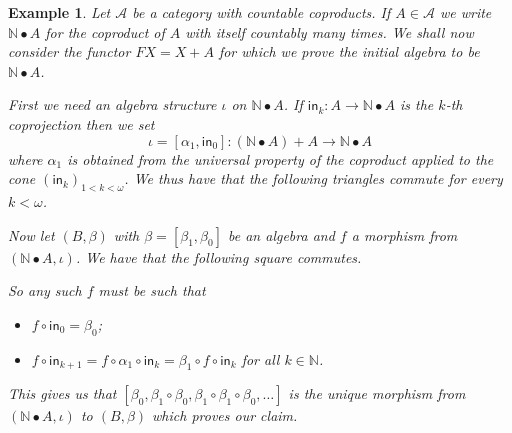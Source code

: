 \documentclass[letterpaper, 11pt, oneside]{memoir}
\theoremstyle{myteo}
\newtheorem{example}[theorem]{Example}
\numberwithin{equation}{section}
\newcommand{\id}{\textsf{id}}
\begin{document}
\begin{example}
  Let \(\mathscr{A}\) be a category with countable coproducts.
  If \(A \in \mathscr{A}\) we write \(\mathbb{N} \bullet A\) for the coproduct of \(A\) with itself countably many times.
  We shall now consider the functor \(FX = X + A\) for which we prove the initial algebra to be \(\mathbb{N} \bullet A\).

  First we need an algebra structure \(\iota\) on \(\mathbb{N} \bullet A\).
  If \(\textsf{in}_k \colon A \to \mathbb{N} \bullet A\) is the \(k\)-th coprojection then we set
  \begin{equation}
    \iota = [\alpha_1, \textsf{in}_0] \colon (\mathbb{N} \bullet A) + A \to \mathbb{N} \bullet A
  \end{equation}
  where \(\alpha_1\) is obtained from the universal property of the coproduct applied to the cone \((\textsf{in}_k)_{1 < k < \omega}\).
  We thus have that the following triangles commute for every \(k < \omega\).
  \begin{center}
  \end{center}
  Now let \((B, \beta)\) with \(\beta = [\beta_1, \beta_0]\) be an algebra and \(f\) a morphism from \((\mathbb{N} \bullet A, \iota)\).
  We have that the following square commutes.
  \begin{center}
  \end{center}
  So any such \(f\) must be such that
  \begin{itemize}
  \item[1.] \(f \circ \textsf{in}_0 = \beta_0\);
  \item[2.] \(f \circ \textsf{in}_{k+1} = f \circ \alpha_1 \circ \textsf{in}_k = \beta_1 \circ f \circ \textsf{in}_k\) for all \(k \in \mathbb{N}\).
  \end{itemize}
  This gives us that \([\beta_0, \beta_1\circ\beta_0, \beta_1\circ\beta_1\circ\beta_0, \ldots]\) is the unique morphism from \((\mathbb{N} \bullet A, \iota)\) to \((B, \beta)\) which proves our claim.
\end{example}
\end{document}
